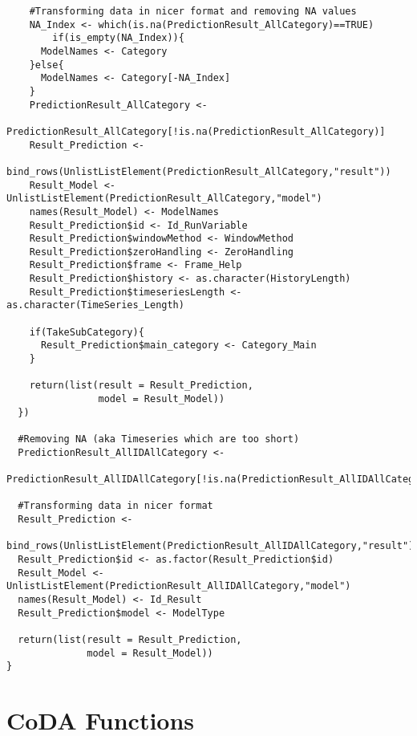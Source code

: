 \begin{verbatim}
    #Transforming data in nicer format and removing NA values
    NA_Index <- which(is.na(PredictionResult_AllCategory)==TRUE)
		if(is_empty(NA_Index)){
      ModelNames <- Category
    }else{
      ModelNames <- Category[-NA_Index]
    }
    PredictionResult_AllCategory <- 
							PredictionResult_AllCategory[!is.na(PredictionResult_AllCategory)]
    Result_Prediction <- 
							bind_rows(UnlistListElement(PredictionResult_AllCategory,"result"))
    Result_Model <- UnlistListElement(PredictionResult_AllCategory,"model")
    names(Result_Model) <- ModelNames
    Result_Prediction$id <- Id_RunVariable
    Result_Prediction$windowMethod <- WindowMethod
    Result_Prediction$zeroHandling <- ZeroHandling
    Result_Prediction$frame <- Frame_Help
    Result_Prediction$history <- as.character(HistoryLength)
    Result_Prediction$timeseriesLength <- as.character(TimeSeries_Length)
    
    if(TakeSubCategory){
      Result_Prediction$main_category <- Category_Main
    }
    
    return(list(result = Result_Prediction,
                model = Result_Model))
  })

  #Removing NA (aka Timeseries which are too short)
  PredictionResult_AllIDAllCategory <- 
						PredictionResult_AllIDAllCategory[!is.na(PredictionResult_AllIDAllCategory)]
  
  #Transforming data in nicer format
  Result_Prediction <- 
							bind_rows(UnlistListElement(PredictionResult_AllIDAllCategory,"result"))
  Result_Prediction$id <- as.factor(Result_Prediction$id)
  Result_Model <- UnlistListElement(PredictionResult_AllIDAllCategory,"model")
  names(Result_Model) <- Id_Result
  Result_Prediction$model <- ModelType
  
  return(list(result = Result_Prediction,
              model = Result_Model))
}
\end{verbatim}

\section{CoDA Functions}
\label{sec:Coda Functions}

